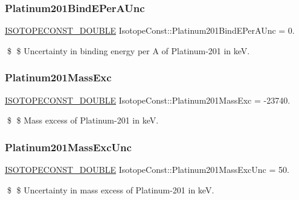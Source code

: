 \subsubsection{\texorpdfstring{Platinum201\+Bind\+E\+Per\+A\+Unc}{Platinum201BindEPerAUnc}}
{\footnotesize\ttfamily \mbox{\hyperlink{group___isotope_const-_macros_ga8f45a7272ce02c0b4c65c44636ed719a}{I\+S\+O\+T\+O\+P\+E\+C\+O\+N\+S\+T\+\_\+\+D\+O\+U\+B\+LE}} Isotope\+Const\+::\+Platinum201\+Bind\+E\+Per\+A\+Unc = 0.}

\$ \$ Uncertainty in binding energy per A of Platinum-\/201 in keV. \mbox{\label{group___isotope_const-_platinum-_pt201_gae0eefd1d31d27a594db15591f521ce8a}} 
\subsubsection{\texorpdfstring{Platinum201\+Mass\+Exc}{Platinum201MassExc}}
{\footnotesize\ttfamily \mbox{\hyperlink{group___isotope_const-_macros_ga8f45a7272ce02c0b4c65c44636ed719a}{I\+S\+O\+T\+O\+P\+E\+C\+O\+N\+S\+T\+\_\+\+D\+O\+U\+B\+LE}} Isotope\+Const\+::\+Platinum201\+Mass\+Exc = -\/23740.}

\$ \$ Mass excess of Platinum-\/201 in keV. \mbox{\label{group___isotope_const-_platinum-_pt201_ga79c4ed08525e554a9beccf61179200ba}} 
\subsubsection{\texorpdfstring{Platinum201\+Mass\+Exc\+Unc}{Platinum201MassExcUnc}}
{\footnotesize\ttfamily \mbox{\hyperlink{group___isotope_const-_macros_ga8f45a7272ce02c0b4c65c44636ed719a}{I\+S\+O\+T\+O\+P\+E\+C\+O\+N\+S\+T\+\_\+\+D\+O\+U\+B\+LE}} Isotope\+Const\+::\+Platinum201\+Mass\+Exc\+Unc = 50.}

\$ \$ Uncertainty in mass excess of Platinum-\/201 in keV. \mbox{\label{group___isotope_const-_platinum-_pt201_gad2c61f68b4e41773458089a204506970}} 
